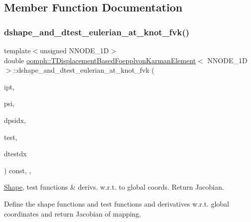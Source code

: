 \subsection{Member Function Documentation}
\mbox{\label{classoomph_1_1TDisplacementBasedFoepplvonKarmanElement_ad690f5dcab636d760f70779bdb60bd4e}} 
\subsubsection{\texorpdfstring{dshape\+\_\+and\+\_\+dtest\+\_\+eulerian\+\_\+at\+\_\+knot\+\_\+fvk()}{dshape\_and\_dtest\_eulerian\_at\_knot\_fvk()}}
{\footnotesize\ttfamily template$<$unsigned N\+N\+O\+D\+E\+\_\+1D$>$ \\
double \hyperlink{classoomph_1_1TDisplacementBasedFoepplvonKarmanElement}{oomph\+::\+T\+Displacement\+Based\+Foepplvon\+Karman\+Element}$<$ N\+N\+O\+D\+E\+\_\+1D $>$\+::dshape\+\_\+and\+\_\+dtest\+\_\+eulerian\+\_\+at\+\_\+knot\+\_\+fvk (\begin{DoxyParamCaption}\item[{const unsigned \&}]{ipt,  }\item[{\hyperlink{classoomph_1_1Shape}{Shape} \&}]{psi,  }\item[{\hyperlink{classoomph_1_1DShape}{D\+Shape} \&}]{dpsidx,  }\item[{\hyperlink{classoomph_1_1Shape}{Shape} \&}]{test,  }\item[{\hyperlink{classoomph_1_1DShape}{D\+Shape} \&}]{dtestdx }\end{DoxyParamCaption}) const\hspace{0.3cm}{\ttfamily [inline]}, {\ttfamily [protected]}, {\ttfamily [virtual]}}



\hyperlink{classoomph_1_1Shape}{Shape}, test functions \& derivs. w.\+r.\+t. to global coords. Return Jacobian. 

Define the shape functions and test functions and derivatives w.\+r.\+t. global coordinates and return Jacobian of mapping.

